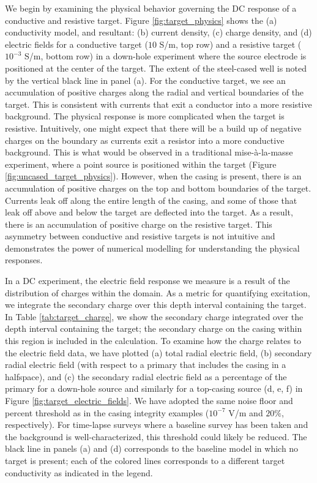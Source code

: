 \documentclass[extra,mreferee]{gji}
\begin{document}
We begin by examining the physical behavior governing the DC response of a conductive and resistive target. Figure \ref{fig:target_physics} shows the (a) conductivity model, and resultant: (b) current density, (c) charge density, and (d) electric fields for a conductive target ($10$ S/m, top row) and a resistive target ($10^{-3}$ S/m, bottom row) in a down-hole experiment where the source electrode is positioned at the center of the target. The extent of the steel-cased well is noted by the vertical black line in panel (a). For the conductive target, we see an accumulation of positive charges along the radial and vertical boundaries of the target. This is consistent with currents that exit a conductor into a more resistive background. The physical response is more complicated when the target is resistive. Intuitively, one might expect that there will be a build up of negative charges on the boundary as currents exit a resistor into a more conductive background. This is what would be observed in a traditional mise-\`a-la-masse experiment, where a point source is positioned within the target (Figure \ref{fig:uncased_target_physics}). However, when the casing is present, there is an accumulation of positive charges on the top and bottom boundaries of the target. Currents leak off along the entire length of the casing, and some of those that leak off above and below the target are deflected into the target. As a result, there is an accumulation of positive charge on the resistive target. This asymmetry between conductive and resistive targets is not intuitive and demonstrates the power of numerical modelling for understanding the physical responses.








In a DC experiment, the electric field response we measure is a result of the distribution of charges within the domain. As a metric for quantifying excitation, we integrate the secondary charge over this depth interval containing the target. In Table \ref{tab:target_charge}, we show the secondary charge integrated over the depth interval containing the target; the secondary charge on the casing within this region is included in the calculation. To examine how the charge relates to the electric field data, we have plotted (a) total radial electric field, (b) secondary radial electric field (with respect to a primary that includes the casing in a halfspace), and (c) the secondary radial electric field as a percentage of the primary for a down-hole source and similarly for a top-casing source (d, e, f) in Figure \ref{fig:target_electric_fields}. We have adopted the same noise floor and percent threshold as in the casing integrity examples ($10^{-7}$ V/m and $20\%$, respectively). For time-lapse surveys where a baseline survey has been taken and the background is well-characterized, this threshold could likely be reduced. The black line in panels (a) and (d) corresponds to the baseline model in which no target is present; each of the colored lines corresponds to a different target conductivity as indicated in the legend.
\end{document}
